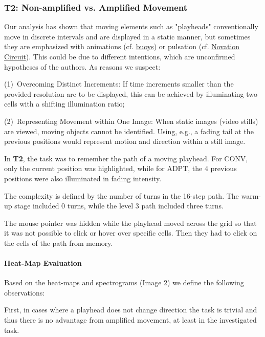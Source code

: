 \documentclass[sigconf]{nimeart}
\begin{document}
\subsubsection{\texorpdfstring{\textbf{T2}: Non-amplified vs. Amplified Movement}{T2: Non-amplified vs. Amplified Movement}}\label{t2-non-amplified-vs.-amplified-movement}

Our analysis has shown that moving elements such as "playheads" conventionally move in discrete intervals and are displayed in a static manner, but sometimes they are emphasized with animations (cf. \href{https://vimeo.com/472114370}{buoys}) or pulsation (cf. \href{https://novationmusic.com/en/circuit/circuit-tracks}{Novation Circuit}). This could be due to different intentions, which are unconfirmed hypotheses of the authors. As reasons we suspect:

(1)~Overcoming Distinct Increments: If time increments smaller than the provided resolution are to be displayed, this can be achieved by illuminating two cells with a shifting illumination ratio;

(2)~Representing Movement within One Image: When static images (video stills) are viewed, moving objects cannot be identified. Using, e.g., a fading tail at the previous positions would represent motion and direction within a still image.

In \textbf{T2}, the task was to remember the path of a moving playhead. For CONV, only the current position was highlighted, while for ADPT, the 4 previous positions were also illuminated in fading intensity.

The complexity is defined by the number of turns in the 16-step path. The warm-up stage included 0 turns, while the level 3 path included three turns.

The mouse pointer was hidden while the playhead moved across the grid so that it was not possible to click or hover over specific cells. Then they had to click on the cells of the path from memory.

\paragraph{Heat-Map Evaluation}\label{heat-map-evaluation-1}

Based on the heat-maps and spectrograms (Image 2) we define the following observations:

First, in cases where a playhead does not change direction the task is trivial and thus there is no advantage from amplified movement, at least in the investigated task.
\end{document}
